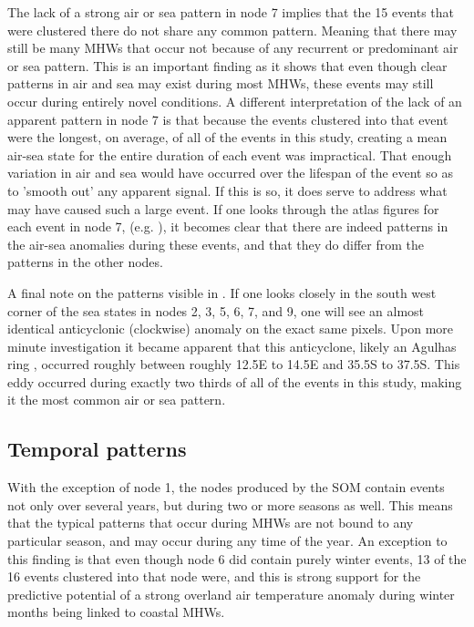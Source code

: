 \documentclass[a4paper,10pt,review]{elsarticle}
\begin{document}
The lack of a strong air or sea pattern in node 7 implies that the 15 events that were clustered there do not share any common pattern. Meaning that there may still be many MHWs that occur not because of any recurrent or predominant air or sea pattern. This is an important finding as it shows that even though clear patterns in air and sea may exist during most MHWs, these events may still occur during entirely novel conditions. A different interpretation of the lack of an apparent pattern in node 7 is that because the events clustered into that event were the longest, on average, of all of the events in this study, creating a mean air-sea state for the entire duration of each event was impractical. That enough variation in air and sea would have occurred over the lifespan of the event so as to 'smooth out' any apparent signal. If this is so, it does serve to address what may have caused such a large event. If one looks through the atlas figures for each event in node 7, (e.g. ), it becomes clear that there are indeed patterns in the air-sea anomalies during these events, and that they do differ from the patterns in the other nodes.

A final note on the patterns visible in . If one looks closely in the south west corner of the sea states in nodes 2, 3, 5, 6, 7, and 9, one will see an almost identical anticyclonic (clockwise) anomaly on the exact same pixels. Upon more minute investigation it became apparent that this anticyclone, likely an Agulhas ring \citep{Hutchings2009}, occurred roughly between roughly 12.5\degree E to 14.5\degree E and 35.5\degree S to 37.5\degree S. This eddy occurred during exactly two thirds of all of the events in this study, making it the most common air or sea pattern.

\subsection{Temporal patterns}
With the exception of node 1, the nodes produced by the SOM contain events not only over several years, but during two or more seasons as well. This means that the typical patterns that occur during MHWs are not bound to any particular season, and may occur during any time of the year. An exception to this finding is that even though node 6 did contain purely winter events, 13 of the 16 events clustered into that node were, and this is strong support for the predictive potential of a strong overland air temperature anomaly during winter months being linked to coastal MHWs.
\end{document}
